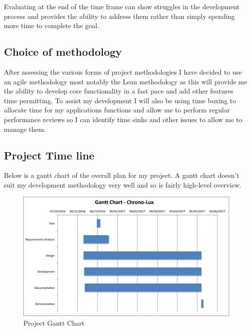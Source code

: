 Evaluating at the end of the time frame can show struggles in the
development process and provides the ability to address them rather than
simply spending more time to complete the goal.

\subsection{Choice of methodology}\label{choice-of-methodology}

After assessing the various forms of project methodologies I have
decided to use an agile methodology most notably the Lean methodology as
this will provide me the ability to develop core functionality in a fast
pace and add other features time permitting. To assist my development I
will also be using time boxing to allocate time for my applications
functions and allow me to perform regular performance reviews so I can
identify time sinks and other issues to allow me to manage them.

\subsection{Project Time line}\label{project-time-line}

Below is a gantt chart of the overall plan for my project. A gantt chart
doesn't suit my development methodology very well and so is fairly
high-level overview.

\begin{landscape}
\begin{figure}[htbp]
\includegraphics{Images/gantt.png}
\caption{Project Gantt Chart}
\end{figure}
\end{landscape}
